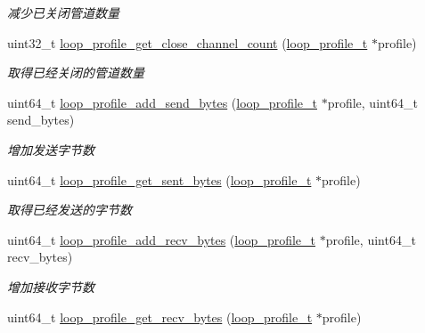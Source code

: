 \begin{DoxyCompactItemize}
\begin{DoxyCompactList}\small\item\em 减少已关闭管道数量 \end{DoxyCompactList}\item 
uint32\+\_\+t \hyperlink{a00078_a5fd58f572ac680a32930d275c5854e8e_a5fd58f572ac680a32930d275c5854e8e}{loop\+\_\+profile\+\_\+get\+\_\+close\+\_\+channel\+\_\+count} (\hyperlink{a00051_ad060e1396346d2f5db1ec0597376a107_ad060e1396346d2f5db1ec0597376a107}{loop\+\_\+profile\+\_\+t} $\ast$profile)
\begin{DoxyCompactList}\small\item\em 取得已经关闭的管道数量 \end{DoxyCompactList}\item 
uint64\+\_\+t \hyperlink{a00078_a04e566a4074bb91aa86119c34157c440_a04e566a4074bb91aa86119c34157c440}{loop\+\_\+profile\+\_\+add\+\_\+send\+\_\+bytes} (\hyperlink{a00051_ad060e1396346d2f5db1ec0597376a107_ad060e1396346d2f5db1ec0597376a107}{loop\+\_\+profile\+\_\+t} $\ast$profile, uint64\+\_\+t send\+\_\+bytes)
\begin{DoxyCompactList}\small\item\em 增加发送字节数 \end{DoxyCompactList}\item 
uint64\+\_\+t \hyperlink{a00078_ad8eec173abe7c0e50137b6ac74c2c817_ad8eec173abe7c0e50137b6ac74c2c817}{loop\+\_\+profile\+\_\+get\+\_\+sent\+\_\+bytes} (\hyperlink{a00051_ad060e1396346d2f5db1ec0597376a107_ad060e1396346d2f5db1ec0597376a107}{loop\+\_\+profile\+\_\+t} $\ast$profile)
\begin{DoxyCompactList}\small\item\em 取得已经发送的字节数 \end{DoxyCompactList}\item 
uint64\+\_\+t \hyperlink{a00078_ac826bfebabc5f965c6906ce83400f1de_ac826bfebabc5f965c6906ce83400f1de}{loop\+\_\+profile\+\_\+add\+\_\+recv\+\_\+bytes} (\hyperlink{a00051_ad060e1396346d2f5db1ec0597376a107_ad060e1396346d2f5db1ec0597376a107}{loop\+\_\+profile\+\_\+t} $\ast$profile, uint64\+\_\+t recv\+\_\+bytes)
\begin{DoxyCompactList}\small\item\em 增加接收字节数 \end{DoxyCompactList}\item 
uint64\+\_\+t \hyperlink{a00078_aabcce950d0234d7dab3740e97f914c95_aabcce950d0234d7dab3740e97f914c95}{loop\+\_\+profile\+\_\+get\+\_\+recv\+\_\+bytes} (\hyperlink{a00051_ad060e1396346d2f5db1ec0597376a107_ad060e1396346d2f5db1ec0597376a107}{loop\+\_\+profile\+\_\+t} $\ast$profile)

\end{DoxyCompactItemize}
